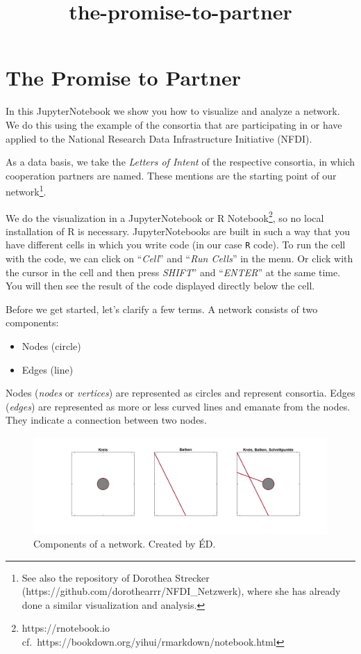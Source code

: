 \documentclass[11pt]{article}
\title{the-promise-to-partner}
\providecommand{\tightlist}{%
      \setlength{\itemsep}{0pt}\setlength{\parskip}{0pt}}
\begin{document}
    
    \maketitle
    
    

    
    \hypertarget{the-promise-to-partner}{%
\section{The Promise to Partner}\label{the-promise-to-partner}}

    In this JupyterNotebook we show you how to visualize and analyze a
network. We do this using the example of the consortia that are
participating in or have applied to the National Research Data
Infrastructure Initiative (NFDI).

As a data basis, we take the \emph{Letters of Intent} of the respective
consortia, in which cooperation partners are named. These mentions are
the starting point of our network\footnote{See also the repository of
  Dorothea Strecker (https://github.com/dorothearrr/NFDI\_Netzwerk),
  where she has already done a similar visualization and analysis.}.

We do the visualization in a JupyterNotebook or R Notebook\footnote{https://rnotebook.io
  cf.~https://bookdown.org/yihui/rmarkdown/notebook.html}, so no local
installation of R is necessary. JupyterNotebooks are built in such a way
that you have different cells in which you write code (in our case
\texttt{R} code). To run the cell with the code, we can click on
``\emph{Cell}'' and ``\emph{Run Cells}'' in the menu. Or click with the
cursor in the cell and then press \emph{SHIFT}'' and ``\emph{ENTER}'' at
the same time. You will then see the result of the code displayed
directly below the cell.

    Before we get started, let's clarify a few terms. A network consists of
two components:

\begin{itemize}
\tightlist
\item
  Nodes (circle)
\item
  Edges (line)
\end{itemize}

Nodes (\emph{nodes} or \emph{vertices}) are represented as circles and
represent consortia. Edges (\emph{edges}) are represented as more or
less curved lines and emanate from the nodes. They indicate a connection
between two nodes.

\begin{figure}
\centering
\includegraphics{img/Einheitskreis-Gestalt.png}
\caption{Components of a network. Created by ÉD.}
\end{figure}
\end{document}
